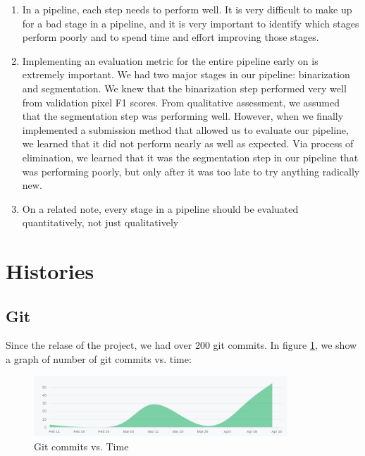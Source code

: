 \documentclass[paper=letter, fontsize=12pt]{article}
\numberwithin{equation}{section} %
\numberwithin{figure}{section} %
\numberwithin{table}{section} %
\begin{document}
\begin{enumerate}

    \item In a pipeline, each step needs to perform well. It is very difficult
        to make up for a bad stage in a pipeline, and it is very important to
        identify which stages perform poorly and to spend time and effort
        improving those stages.

    \item Implementing an evaluation metric for the entire pipeline early on is
        extremely important. We had two major stages in our pipeline:
        binarization and segmentation. We knew that the binarization step
        performed very well from validation pixel F1 scores. From qualitative
        assessment, we assumed that the segmentation step was performing well.
        However, when we finally implemented a submission method that allowed
        us to evaluate our pipeline, we learned that it did not perform nearly
        as well as expected. Via process of elimination, we learned that it was
        the segmentation step in our pipeline that was performing poorly, but
        only after it was too late to try anything radically new.

    \item On a related note, every stage in a pipeline should be evaluated
        quantitatively, not just qualitatively

\end{enumerate}

\section{ Histories }

\subsection{ Git }

Since the relase of the project, we had over 200 git commits. In figure
\ref{fig:commit_graph}, we show a graph of number of git commits vs. time:

\begin{figure}[H]
    \centering
    \includegraphics[width=0.85\textwidth]{./figs/commit_graph.png}
    \caption{Git commits vs. Time}
    \label{fig:commit_graph}
\end{figure}
\end{document}
